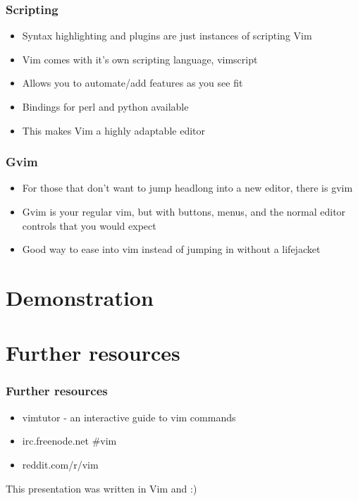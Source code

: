 \documentclass{beamer}
\begin{document}
\begin{frame}
    \frametitle{Scripting}
    \begin{itemize}
	\item Syntax highlighting and plugins are just instances of scripting Vim
	\item Vim comes with it's own scripting language, vimscript
	\item Allows you to automate/add features as you see fit
	\item Bindings for perl and python available
	\item This makes Vim a highly adaptable editor
    \end{itemize}
\end{frame}

\begin{frame}
    \frametitle{Gvim}
    \begin{itemize}
	\item For those that don't want to jump headlong into a new editor,
	    there is gvim
	\item Gvim is your regular vim, but with buttons, menus, and the normal
	    editor controls that you would expect
	\item Good way to ease into vim instead of jumping in without a 
	    lifejacket
    \end{itemize}
\end{frame}

\section{Demonstration}

\section{Further resources}

\begin{frame}
    \frametitle{Further resources}
    \begin{itemize}
	\item vimtutor - an interactive guide to vim commands
	\item irc.freenode.net \#vim
	\item reddit.com/r/vim
    \end{itemize}
\end{frame}

\begin{frame}
    This presentation was written in Vim and \LaTeXe{} :)
\end{frame}
\end{document}
